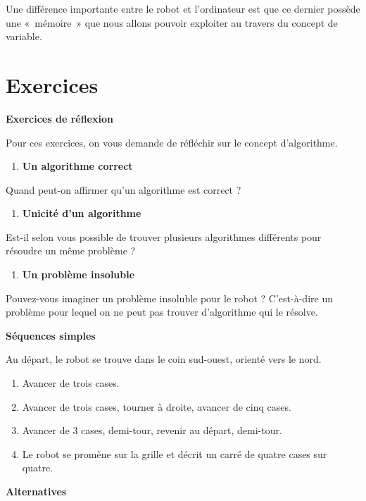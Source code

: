 {
Une différence importante entre le robot et
l'ordinateur est que ce dernier possède une
«~mémoire~» que nous allons pouvoir exploiter au travers du concept de
variable.}

\section{Exercices}
{\sffamily\bfseries\upshape
Exercices de réflexion}

{
Pour ces exercices, on vous demande de réfléchir sur le concept
d'algorithme.}

\liststyleExercice
\begin{enumerate}
\item {\sffamily\bfseries
Un algorithme correct}
\end{enumerate}
{
Quand peut-on affirmer qu'un algorithme est correct ?}

\liststyleExercice
\setcounter{saveenum}{\value{enumi}}
\begin{enumerate}
\setcounter{enumi}{\value{saveenum}}
\item {\sffamily\bfseries
Unicité d'un algorithme}
\end{enumerate}
{
Est-il selon vous possible de trouver plusieurs algorithmes différents
pour résoudre un même problème ?}

\liststyleExercice
\setcounter{saveenum}{\value{enumi}}
\begin{enumerate}
\setcounter{enumi}{\value{saveenum}}
\item {\sffamily\bfseries
Un problème insoluble}
\end{enumerate}
{
Pouvez-vous imaginer un problème insoluble pour le robot ?
C'est-à-dire un problème pour lequel on ne peut pas
trouver d'algorithme qui le résolve.}

{\sffamily\bfseries\upshape
Séquences simples}

{
Au départ, le robot se trouve dans le coin sud-ouest, orienté vers le
nord. }

\liststyleExercice
\setcounter{saveenum}{\value{enumi}}
\begin{enumerate}
\setcounter{enumi}{\value{saveenum}}
\item {
Avancer de trois cases.}
\item {
Avancer de trois cases, tourner à droite, avancer de cinq cases.}
\item {
Avancer de 3 cases, demi-tour, revenir au départ, demi-tour.}
\item {
Le robot se promène sur la grille et décrit un carré de quatre cases sur
quatre.}
\end{enumerate}
{\sffamily\bfseries\upshape
Alternatives}

